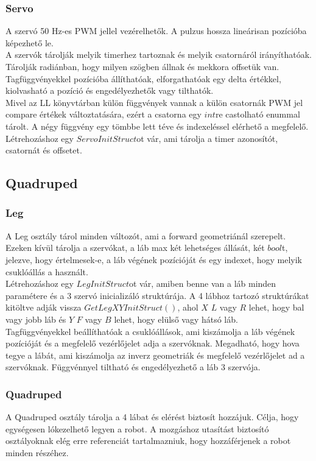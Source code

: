 \documentclass{article}
\begin{document}
\subsubsection{Servo}
A szervó 50 Hz-es PWM jellel vezérelhetők. A pulzus hossza lineárisan pozícióba képezhető le.\\
A szervók tárolják melyik timerhez tartoznak és melyik csatornáról irányíthatóak. Tárolják radiánban, hogy milyen szögben állnak és mekkora offsetük van. Tagfüggvényekkel pozícióba állíthatóak, elforgathatóak egy delta értékkel, kiolvasható a pozíció és engedélyezhetők vagy tilthatók.\\
Mivel az LL könyvtárban külön függvények vannak a külön csatornák PWM jel compare értékek változtatására, ezért a csatorna egy $int$re castolható enummal tárolt. A négy függvény egy tömbbe lett téve és indexeléssel elérhető a megfelelő.\\
Létrehozáshoz egy $ServoInitStruct$ot vár, ami tárolja a timer azonosítót, csatornát és offsetet.
\subsection{Quadruped}
\subsubsection{Leg}
A Leg osztály tárol minden változót, ami a forward geometriánál szerepelt. Ezeken kívül tárolja a szervókat, a láb max két lehetséges állását, két $bool$t, jelezve, hogy értelmesek-e, a láb végének pozícióját és egy indexet, hogy melyik csuklóállás a használt.\\
Létrehozáshoz egy $LegInitStruct$ot vár, amiben benne van a láb minden paramétere és a 3 szervó inicializáló struktúrája. A 4 lábhoz tartozó struktúrákat kitöltve adják vissza $GetLegXYInitStruct()$, ahol $X$ $L$ vagy $R$ lehet, hogy bal vagy jobb láb és $Y$ $F$ vagy $B$ lehet, hogy elülső vagy hátsó láb.\\
Tagfüggvényekkel beállíthatóak a csuklóállások, ami kiszámolja a láb végének pozícióját és a megfelelő vezérlőjelet adja a szervóknak. Megadható, hogy hova tegye a lábát, ami kiszámolja az inverz geometriák és megfelelő vezérlőjelet ad a szervóknak. Függvénnyel tiltható és engedélyezhető a láb 3 szervója.
\subsubsection{Quadruped}
A Quadruped osztály tárolja a 4 lábat és elérést biztosít hozzájuk. Célja, hogy egységesen lókezelhető legyen a robot. A mozgáshoz utasítást biztosító osztályoknak elég erre referenciát tartalmazniuk, hogy hozzáférjenek a robot minden részéhez.
\end{document}
